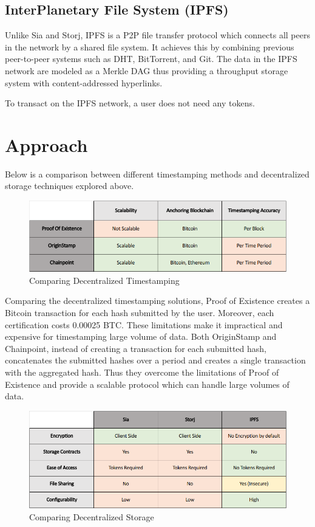 \documentclass[]{article}
\begin{document}
		\subsection{InterPlanetary File System (IPFS)}
			Unlike Sia and Storj, IPFS\cite{benet2014ipfs} is a P2P file transfer protocol which connects all peers in the network by a shared file system. It achieves this by combining previous peer-to-peer systems such as DHT, BitTorrent, and Git. The data in the IPFS network are modeled as a Merkle DAG thus providing a throughput storage system with content-addressed hyperlinks.
			
			To transact on the IPFS network, a user does not need any tokens.
	
	\newpage
	\section{Approach}
		Below is a comparison between different timestamping methods and decentralized storage techniques explored above.
		
		\begin{figure}[h]
			\includegraphics[width=\linewidth]{comparison-timestamping.png}
			\caption{Comparing Decentralized Timestamping}
			\label{fig:comparison-timestamping}
		\end{figure}
	
		Comparing the decentralized timestamping solutions, Proof of Existence creates a Bitcoin transaction for each hash submitted by the user. Moreover, each certification costs 0.00025 BTC. These limitations make it impractical and expensive for timestamping large volume of data. Both OriginStamp and Chainpoint, instead of creating a transaction for each submitted hash, concatenates the submitted hashes over a period and creates a single transaction with the aggregated hash. Thus they overcome the limitations of Proof of Existence and provide a scalable protocol which can handle large volumes of data.
	
		\begin{figure}[h]
			\includegraphics[width=\linewidth]{comparison-storage.png}
			\caption{Comparing Decentralized Storage}
			\label{fig:comparison-storage}
		\end{figure}
	
\end{document}
